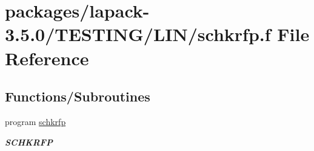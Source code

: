 \hypertarget{schkrfp_8f}{}\section{packages/lapack-\/3.5.0/\+T\+E\+S\+T\+I\+N\+G/\+L\+I\+N/schkrfp.f File Reference}
\label{schkrfp_8f}
\subsection*{Functions/\+Subroutines}
\begin{DoxyCompactItemize}
\item 
program \hyperlink{group__single__lin_gade3cced2f04dda3067af656de6b93f76}{schkrfp}
\begin{DoxyCompactList}\small\item\em {\bfseries S\+C\+H\+K\+R\+F\+P} \end{DoxyCompactList}\end{DoxyCompactItemize}
